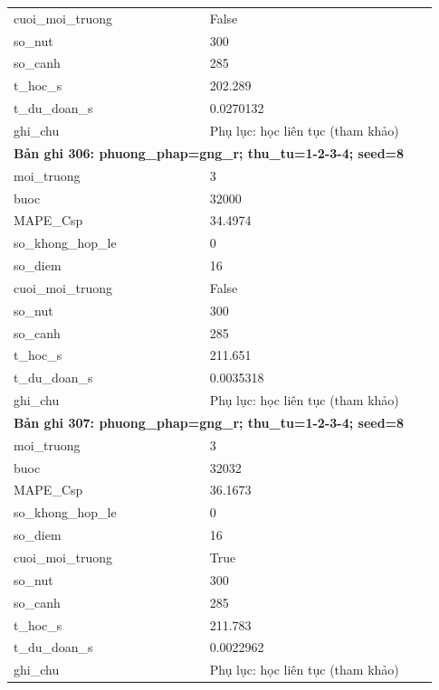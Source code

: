 \begin{longtable}{p{0.43\linewidth}p{0.50\linewidth}}
cuoi\_\allowbreak moi\_\allowbreak truong & False \\
so\_\allowbreak nut & 300 \\
so\_\allowbreak canh & 285 \\
t\_\allowbreak hoc\_\allowbreak s & 202.289 \\
t\_\allowbreak du\_\allowbreak doan\_\allowbreak s & 0.0270132 \\
ghi\_\allowbreak chu & Phụ lục: học liên tục (tham khảo) \\
\midrule
\multicolumn{2}{p{0.95\linewidth}}{\textbf{Bản ghi 306: phuong\_phap=gng\_r; thu\_tu=1-2-3-4; seed=8}} \\
moi\_\allowbreak truong & 3 \\
buoc & 32000 \\
MAPE\_\allowbreak Csp & 34.4974 \\
so\_\allowbreak khong\_\allowbreak hop\_\allowbreak le & 0 \\
so\_\allowbreak diem & 16 \\
cuoi\_\allowbreak moi\_\allowbreak truong & False \\
so\_\allowbreak nut & 300 \\
so\_\allowbreak canh & 285 \\
t\_\allowbreak hoc\_\allowbreak s & 211.651 \\
t\_\allowbreak du\_\allowbreak doan\_\allowbreak s & 0.0035318 \\
ghi\_\allowbreak chu & Phụ lục: học liên tục (tham khảo) \\
\midrule
\multicolumn{2}{p{0.95\linewidth}}{\textbf{Bản ghi 307: phuong\_phap=gng\_r; thu\_tu=1-2-3-4; seed=8}} \\
moi\_\allowbreak truong & 3 \\
buoc & 32032 \\
MAPE\_\allowbreak Csp & 36.1673 \\
so\_\allowbreak khong\_\allowbreak hop\_\allowbreak le & 0 \\
so\_\allowbreak diem & 16 \\
cuoi\_\allowbreak moi\_\allowbreak truong & True \\
so\_\allowbreak nut & 300 \\
so\_\allowbreak canh & 285 \\
t\_\allowbreak hoc\_\allowbreak s & 211.783 \\
t\_\allowbreak du\_\allowbreak doan\_\allowbreak s & 0.0022962 \\
ghi\_\allowbreak chu & Phụ lục: học liên tục (tham khảo) \\

\end{longtable}
